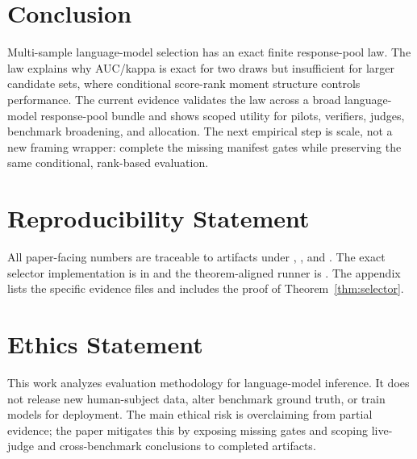 \documentclass{article}
\begin{document}
\section{Conclusion}

Multi-sample language-model selection has an exact finite response-pool law.
The law explains why AUC/kappa is exact for two draws but insufficient for
larger candidate sets, where conditional score-rank moment structure controls
performance. The current evidence validates the law across a broad
language-model response-pool bundle and shows scoped utility for pilots,
verifiers, judges, benchmark broadening, and allocation. The next empirical
step is scale, not a new framing wrapper: complete the missing manifest gates
while preserving the same conditional, rank-based evaluation.

\section*{Reproducibility Statement}
All paper-facing numbers are traceable to artifacts under
, , and
. The exact selector implementation is in
 and the theorem-aligned runner is
. The appendix lists the specific evidence
files and includes the proof of Theorem~\ref{thm:selector}.

\section*{Ethics Statement}
This work analyzes evaluation methodology for language-model inference. It
does not release new human-subject data, alter benchmark ground truth, or
train models for deployment. The main ethical risk is overclaiming from
partial evidence; the paper mitigates this by exposing missing gates and
scoping live-judge and cross-benchmark conclusions to completed artifacts.




\appendix
\renewcommand{\thesection}{App.\arabic{section}}

\end{document}
